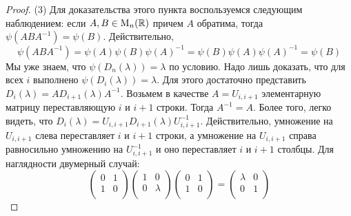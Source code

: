 \begin{proof}
(3) Для доказательства этого пункта воспользуемся следующим наблюдением: если $A,B\in\operatorname{M}_{n}(\mathbb R)$ причем $A$ обратима, тогда $\psi(ABA^{-1}) = \psi(B)$.
Действительно, 
\[
\psi(ABA^{-1}) = \psi(A)\psi(B)\psi(A)^{-1} =  \psi(B)\psi(A)\psi(A)^{-1} = \psi(B)
\]
Мы уже знаем, что $\psi(D_n(\lambda)) = \lambda$ по условию.
Надо лишь доказать, что для всех $i$ выполнено $\psi(D_i(\lambda)) = \lambda$.
Для этого достаточно представить $D_{i}(\lambda) = A D_{i+1}(\lambda)A^{-1}$.
Возьмем в качестве $A = U_{i, i+1}$ элементарную матрицу переставляющую $i$ и $i+1$ строки.
Тогда $A^{-1} = A$.
Более того, легко видеть, что $D_{i}(\lambda) = U_{i, i+1} D_{i+1}(\lambda)U_{i, i+1}^{-1}$.
Действительно, умножение на $U_{i, i+1}$ слева переставляет $i$ и $i+1$ строки, а умножение на $U_{i, i+1}$ справа равносильно умножению на $U_{i, i+1}^{-1}$ и оно переставляет $i$ и $i+1$ столбцы.
Для наглядности двумерный случай:
\[
\begin{pmatrix}
{0}&{1}\\
{1}&{0}\\
\end{pmatrix}
\begin{pmatrix}
{1}&{0}\\
{0}&{\lambda}\\
\end{pmatrix}
\begin{pmatrix}
{0}&{1}\\
{1}&{0}\\
\end{pmatrix}
=
\begin{pmatrix}
{\lambda}&{0}\\
{0}&{1}\\
\end{pmatrix}
\]


\end{proof}
